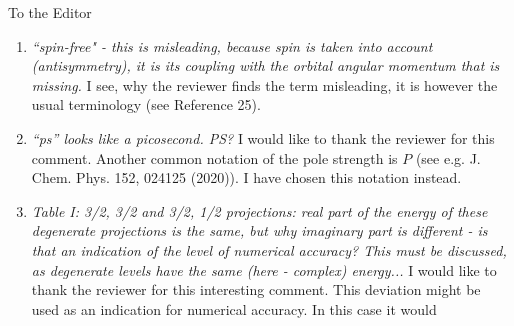 \documentclass[DIN,pagenumber=false,parskip=half,fromalign=left,fromphone=false,fromemail=true,fromurl=false,fromlogo=false,fromrule=false]{scrlttr2}
\begin{document}
\begin{letter}{To the Editor}
\begin{enumerate}
             I would like to thank the reviewer for this comment.
             The information this plot illustrates for Sr is that the an Auger
             decay is energetically allowed and that there is only one
             energetically accessible final state. As the reviewer points out,
             it also illustrates relative pole strengths of the initial states, which
             are given in Table I.
             I chose Sr instead of Ra, because
             the channel opening for $s^{-2}$ final states is more likely to be closed
             in the lighter homologues. If the decay channel is open for the light
             homologue, it is also open for the heavier homologue.\\
             With respect to the pole strengths, the required information is the
             manifold of numbers presented in Table I and the new Table III, illustrated
             in Figure 5 and their
             discussions, required for the later analysis.
             The illustration in Figure 5 is more detailed than the ionization
             spectra can be and I have therefore chosen not to include the
             ionization spectra additionally.
 \item \emph{``spin-free" - this is misleading, because spin is taken into account
             (antisymmetry), it is its coupling with the orbital angular momentum that
             is missing.} \newline
             I see, why the reviewer finds the term misleading,
             it is however the
             usual terminology (see Reference 25).
 \item \emph{``ps'' looks like a picosecond. PS?} \newline
             I would like to thank the reviewer for this comment. Another
             common notation of the pole strength is $P$
             (see e.g. J. Chem. Phys. 152, 024125 (2020)). I have chosen this
             notation instead.
 \item \emph{Table I: 3/2, 3/2 and 3/2, 1/2 projections: real part of the energy of
             these degenerate projections is the same, but why imaginary part is
             different - is that an indication of the level of numerical accuracy?
             This must be discussed, as degenerate levels have the same
             (here - complex) energy... } \newline
       I would like to thank the reviewer for this interesting comment. This deviation
       might be used as an indication for numerical accuracy. In this case it would

\end{enumerate}
\end{letter}
\end{document}

